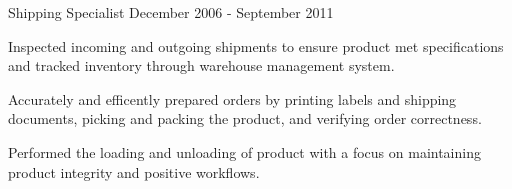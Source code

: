 \begin{cventries}
  \cventry
    {Shipping Specialist}
    {}
    {}
    {December 2006 - September 2011}
    {
      \begin{cvitems}
       \item {Inspected incoming and outgoing shipments to ensure product met specifications and tracked inventory through warehouse management system.}
       \item {Accurately and efficently prepared orders by printing labels and shipping documents, picking and packing the product, and verifying order correctness.}
       \item {Performed the loading and unloading of product with a focus on maintaining product integrity and positive workflows.}
      \end{cvitems}
    }{}{}


\end{cventries}